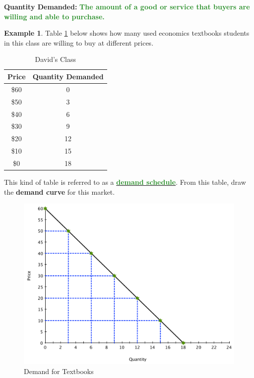 \documentclass[11pt]{article}\usepackage[]{graphicx}\usepackage[]{color}
\theoremstyle{definition}
\newtheorem{exmp}{Example}[section]
\newcommand{\ddp}[1]{{\textbf{\textcolor{ForestGreen}{#1}}}}
\newcommand{\dd}[1]{{\underline{\textbf{\textcolor{ForestGreen}{#1}}}}}
\newcommand{\defn}[1]{\textbf{#1}}
\begin{document}
	\defn{Quantity Demanded:} \ddp{The amount of a good or service that buyers are willing and able to purchase.}
	
	\begin{exmp}
		Table \ref{tab1} below shows how many used economics textbooks students in this class are willing to buy at different prices.
	\begin{table}[ht]
		\caption{David's Class}
		\label{tab1}
		\centering
		\begin{tabular}{  c| c}        
			
			Price   & Quantity Demanded \\
			\hline
			\$60 & 0 \\
			\$50 & 3 \\
			\$40 & 6 \\
			\$30 & 9 \\
			\$20& 12 \\
			\$10 & 15 \\
			\$0 & 18 \\
		\end{tabular}
	\end{table} 
	
	This kind of table is referred to as a \dd{demand schedule}. From this table, draw the \textbf{demand curve} for this market.
	\end{exmp}
	
		\begin{figure}[H]
			\centering
			\includegraphics[scale=.35]{plot7.pdf}
			\caption{Demand for Textbooks}
		\end{figure}
		
\end{document}
